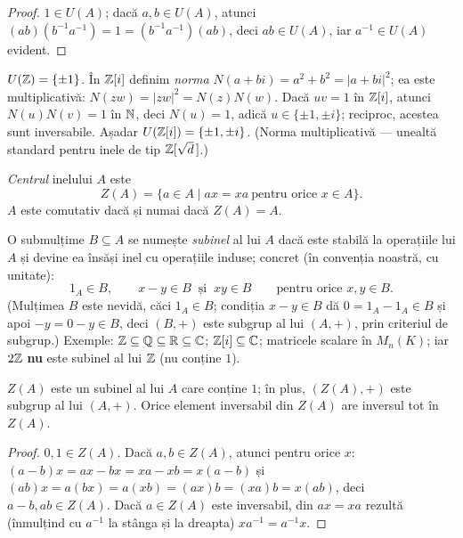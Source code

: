 \begin{proof}
$1\in U(A)$; dacă $a,b\in U(A)$, atunci $(ab)(b^{-1}a^{-1})=1=(b^{-1}a^{-1})(ab)$, deci $ab\in U(A)$, iar $a^{-1}\in U(A)$ evident.
\end{proof}

\begin{exemplu}[{$U(\ZZ[i])$}]\label{ex:gauss}
$U(\mathbb{Z})=\{\pm1\}$. În $\mathbb{Z}[i]$ definim \emph{norma} $N(a+bi)=a^2+b^2=|a+bi|^2$; ea este multiplicativă: $N(zw)=|zw|^2=N(z)N(w)$. Dacă $uv=1$ în $\mathbb{Z}[i]$, atunci $N(u)N(v)=1$ în $\mathbb{N}$, deci $N(u)=1$, adică $u\in\{\pm1,\pm i\}$; reciproc, acestea sunt inversabile. Așadar $U(\mathbb{Z}[i])=\{\pm1,\pm i\}$. (Norma multiplicativă --- unealtă standard pentru inele de tip $\mathbb{Z}[\sqrt d\,]$.)
\end{exemplu}

\begin{definitie}\label{def:centruinel}
\emph{Centrul} inelului $A$ este
\[
Z(A)=\{a\in A\mid ax=xa\ \text{pentru orice }x\in A\}.
\]
$A$ este comutativ dacă și numai dacă $Z(A)=A$.
\end{definitie}

\begin{definitie}[subinel]\label{def:subinel}
O submulțime $B\subseteq A$ se numește \emph{subinel} al lui $A$ dacă este stabilă la operațiile lui $A$ și devine ea însăși inel cu operațiile induse; concret (în convenția noastră, cu unitate):
\[
1_A\in B,\qquad x-y\in B\ \text{ și }\ xy\in B\qquad\text{pentru orice }x,y\in B.
\]
(Mulțimea $B$ este nevidă, căci $1_A\in B$; condiția $x-y\in B$ dă $0=1_A-1_A\in B$ și apoi $-y=0-y\in B$, deci $(B,+)$ este subgrup al lui $(A,+)$, prin criteriul de subgrup.) Exemple: $\mathbb{Z}\subseteq\mathbb{Q}\subseteq\mathbb{R}\subseteq\mathbb{C}$; $\mathbb{Z}[i]\subseteq\mathbb{C}$; matricele scalare în $M_n(K)$; iar $2\mathbb{Z}$ \textbf{nu} este subinel al lui $\mathbb{Z}$ (nu conține $1$).
\end{definitie}

\begin{propozitie}\label{prop:centruinel}
$Z(A)$ este un subinel al lui $A$ care conține $1$; în plus, $(Z(A),+)$ este subgrup al lui $(A,+)$. Orice element inversabil din $Z(A)$ are inversul tot în $Z(A)$.
\end{propozitie}

\begin{proof}
$0,1\in Z(A)$. Dacă $a,b\in Z(A)$, atunci pentru orice $x$: $(a-b)x=ax-bx=xa-xb=x(a-b)$ și $(ab)x=a(bx)=a(xb)=(ax)b=(xa)b=x(ab)$, deci $a-b,ab\in Z(A)$. Dacă $a\in Z(A)$ este inversabil, din $ax=xa$ rezultă (înmulțind cu $a^{-1}$ la stânga și la dreapta) $xa^{-1}=a^{-1}x$.
\end{proof}

